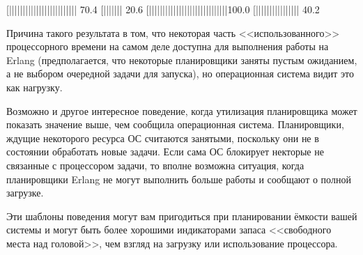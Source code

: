 \documentclass[11pt, oneside]{book}   	%
\begin{document}
\begin{VerbatimText}
[|||||||||||||||||||||||||     70.4%
[|||||||                       20.6%
[|||||||||||||||||||||||||||||100.0%
[||||||||||||||||              40.2%
\end{VerbatimText}

Причина такого результата в том, что некоторая часть <<использованного>> процессорного времени на самом деле доступна для выполнения работы на Erlang (предполагается, что некоторые планировщики заняты пустым ожиданием, а не выбором очередной задачи для запуска), но операционная система видит это как нагрузку.

Возможно и другое интересное поведение, когда утилизация планировщика может показать значение выше, чем сообщила операционная система. Планировщики, ждущие некоторого ресурса ОС считаются занятыми, поскольку они не в состоянии обработать новые задачи. Если сама ОС блокирует некторые не связанные с процессором задачи, то вполне возможна ситуация, когда планировщики Erlang не могут выполнить больше работы и сообщают о полной загрузке.

Эти шаблоны поведения могут вам пригодиться при планировании ёмкости вашей системы и могут быть более хорошими индикаторами запаса <<свободного места над головой>>, чем взгляд на загрузку или использование процессора.

\end{document}
